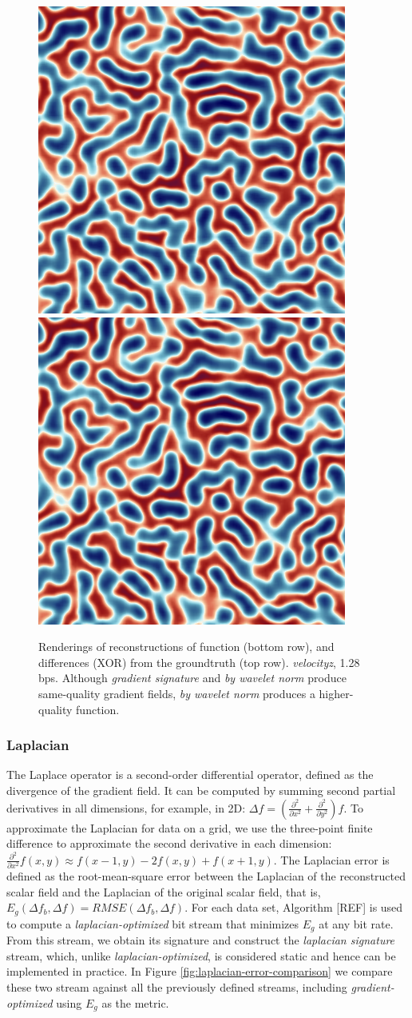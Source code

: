 \begin{figure}[h]
	{\includegraphics[width=0.24\linewidth]{img/laplacian/curr_func2-laplacian-signature.png}}
	{\includegraphics[width=0.24\linewidth]{img/laplacian/curr_func3-laplacian-optimized.png}}
	\caption{Renderings of reconstructions of function (bottom row), and differences (XOR) from the groundtruth (top row). \emph{velocityz}, 1.28 bps. Although \emph{gradient signature} and \emph{by wavelet norm} produce same-quality gradient fields, \emph{by wavelet norm} produces a higher-quality function.}
  \label{fig:gradient-rendering}
\end{figure}

\subsubsection{Laplacian}

The Laplace operator is a second-order differential operator, defined as the divergence of the
gradient field. It can be computed by summing second partial derivatives in all dimensions, for
example, in 2D: $\Delta f=(\frac{{\partial}^2}{\partial{x^2}}+\frac{{\partial}^2}{\partial{y^2}})f$.
To approximate the Laplacian for data on a grid, we use the three-point finite difference to
approximate the second derivative in each dimension: $\frac{{\partial}^2}{\partial{x^2}}f(x,y)
\approx f(x-1,y)-2f(x,y)+f(x+1,y)$. The Laplacian error is defined as the root-mean-square error
between the Laplacian of the reconstructed scalar field and the Laplacian of the original scalar
field, that is, $E_g(\Delta f_b,\Delta f)=RMSE(\Delta f_b,\Delta f)$. For each data set, Algorithm
[REF] is used to compute a \emph{laplacian-optimized} bit stream that minimizes $E_g$ at any bit
rate. From this stream, we obtain its signature and construct the \emph{laplacian signature} stream,
which, unlike \emph{laplacian-optimized}, is considered static and hence can be implemented in
practice. In Figure \ref{fig:laplacian-error-comparison} we compare these two stream against all the
previously defined streams, including \emph{gradient-optimized} using $E_g$ as the metric.

